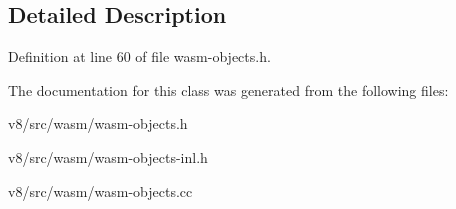 \subsection{Detailed Description}


Definition at line 60 of file wasm-\/objects.\+h.



The documentation for this class was generated from the following files\+:\begin{DoxyCompactItemize}
\item 
v8/src/wasm/wasm-\/objects.\+h\item 
v8/src/wasm/wasm-\/objects-\/inl.\+h\item 
v8/src/wasm/wasm-\/objects.\+cc\end{DoxyCompactItemize}
